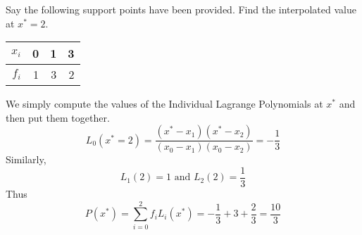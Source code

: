 \begin{example}
	Say the following support points have been provided. Find the interpolated value at $x^* = 2$.\\[0.2 cm]
	\begin{center}
		\begin{tabular}{|r||r|r|r|}
			\hline
			$x_i$ & 0 & 1 & 3 \\
			\hline
			$f_i$ & 1 & 3 & 2 \\
			\hline
		\end{tabular}
	\end{center}
\end{example}
\begin{soln}
	We simply compute the values of the Individual Lagrange Polynomials at $x^*$ and then put them together.
	$$L_0(x^* = 2) = \frac{(x^* - x_1)(x^* - x_2)}{(x_0 - x_1)(x_0 - x_2)} = -\frac{1}{3}$$
	Similarly,
	$$L_1(2) = 1 \text{  and  } L_2(2) = \frac{1}{3}$$
	Thus $$P(x^*) = \sum_{i = 0}^2 f_i L_i(x^*) = -\frac{1}{3}+ 3 + \frac{2}{3} = \frac{10}{3}$$
\end{soln}


